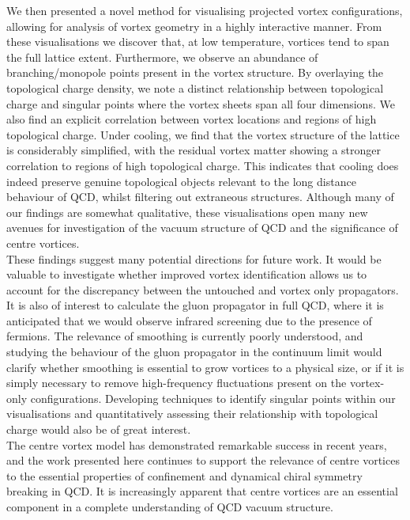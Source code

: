 We then presented a novel method for visualising projected vortex configurations, allowing for analysis of vortex geometry in a highly interactive manner. From these visualisations we discover that, at low temperature, vortices tend to span the full lattice extent. Furthermore, we observe an abundance of branching/monopole points present in the vortex structure. By overlaying the topological charge density, we note a distinct relationship between topological charge and singular points where the vortex sheets span all four dimensions. We also find an explicit correlation between vortex locations and regions of high topological charge. Under cooling, we find that the vortex structure of the lattice is considerably simplified, with the residual vortex matter showing a stronger correlation to regions of high topological charge. This indicates that cooling does indeed preserve genuine topological objects relevant to the long distance behaviour of QCD, whilst filtering out extraneous structures. Although many of our findings are somewhat qualitative, these visualisations open many new avenues for investigation of the vacuum structure of QCD and the significance of centre vortices.\\

These findings suggest many potential directions for future work. It would be valuable to investigate whether improved vortex identification allows us to account for the discrepancy between the untouched and vortex only propagators. It is also of interest to calculate the gluon propagator in full QCD, where it is anticipated that we would observe infrared screening due to the presence of fermions. The relevance of smoothing is currently poorly understood, and studying the behaviour of the gluon propagator in the continuum limit would clarify whether smoothing is essential to grow vortices to a physical size, or if it is simply necessary to remove high-frequency fluctuations present on the vortex-only configurations. Developing techniques to identify singular points within our visualisations and quantitatively assessing their relationship with topological charge would also be of great interest.\\

The centre vortex model has demonstrated remarkable success in recent years, and the work presented here continues to support the relevance of centre vortices to the essential properties of confinement and dynamical chiral symmetry breaking in QCD. It is increasingly apparent that centre vortices are an essential component in a complete understanding of QCD vacuum structure.
